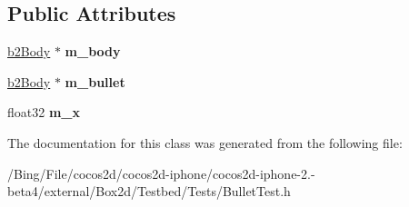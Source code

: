 \subsection*{Public Attributes}
\begin{DoxyCompactItemize}
\item 
\hypertarget{class_bullet_test_a7d89fe2493c69b42978b92853b49e9d1}{\hyperlink{classb2_body}{b2\-Body} $\ast$ {\bfseries m\-\_\-body}}\label{class_bullet_test_a7d89fe2493c69b42978b92853b49e9d1}

\item 
\hypertarget{class_bullet_test_ad1fe0c4d4b29dc455f7587f62fca46e2}{\hyperlink{classb2_body}{b2\-Body} $\ast$ {\bfseries m\-\_\-bullet}}\label{class_bullet_test_ad1fe0c4d4b29dc455f7587f62fca46e2}

\item 
\hypertarget{class_bullet_test_a9abddd33839066a4aa1e898e10b79bde}{float32 {\bfseries m\-\_\-x}}\label{class_bullet_test_a9abddd33839066a4aa1e898e10b79bde}

\end{DoxyCompactItemize}


The documentation for this class was generated from the following file\-:\begin{DoxyCompactItemize}
\item 
/\-Bing/\-File/cocos2d/cocos2d-\/iphone/cocos2d-\/iphone-\/2.-\/beta4/external/\-Box2d/\-Testbed/\-Tests/Bullet\-Test.\-h\end{DoxyCompactItemize}

